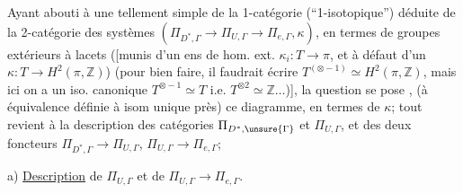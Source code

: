Ayant abouti à une  tellement
simple de la 1-catégorie (``1-isotopique'') déduite
de la 2-catégorie des systèmes
\((\Pi_{D^*,\Gamma}\longrightarrow\Pi_{U,\Gamma}\longrightarrow\Pi_{e,\Gamma},\kappa)\), en termes
de groupes extérieurs à lacets (\inserted{\(\pi\)}[munis
d'un ens de hom. ext. \(\kappa_i:T\longrightarrow\pi\), et
à défaut d'un \(\kappa:T\longrightarrow H^2(\pi,\mathbb Z)\))
(pour bien faire, il faudrait écrire
\(T^{(\otimes-1)}\simeq H^2(\pi,\mathbb Z)\), mais ici on a un iso.
canonique \(T^{\otimes-1}\simeq T\) i.e. \(T^{\otimes 2}\simeq\mathbb Z\ldots\))],
la question se pose ,
(à équivalence définie à isom unique près)
ce diagramme, en termes de \(\kappa\); tout
revient à la  description des
catégories \(\Pi_{D^*,\unsure{\Gamma}}\) et \(\Pi_{U,\Gamma}\), et des deux
foncteurs \(\Pi_{D^*,\Gamma}\longrightarrow\Pi_{U,\Gamma}\), \(\Pi_{U,\Gamma}\longrightarrow\Pi_{e,\Gamma}\);

a) \uline{Description} de \(\Pi_{U,\Gamma}\) et de \(\Pi_{U,\Gamma}\longrightarrow\Pi_{e,\Gamma}\).


